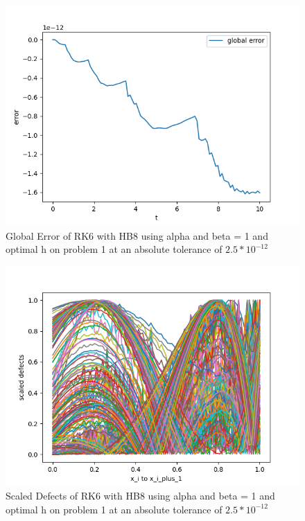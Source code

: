 \documentclass{article}
\begin{document}
\begin{figure}[H]
\centering
\includegraphics[width=0.7\linewidth]{./figures/sharp_tolerance_rk6_with_hb8_p1_global_error}
\caption{Global Error of RK6 with HB8 using alpha and beta = 1 and optimal h on problem 1 at an absolute tolerance of $2.5*10^{-12}$}
\label{fig:sharp_tolerance_rk6_with_hb8_p1_global_error}
\end{figure}

\begin{figure}[H]
\centering
\includegraphics[width=0.7\linewidth]{./figures/sharp_tolerance_rk6_with_hb8_p1_scaled_defects}
\caption{Scaled Defects of RK6 with HB8 using alpha and beta = 1 and optimal h on problem 1 at an absolute tolerance of $2.5*10^{-12}$}
\label{fig:sharp_tolerance_rk6_with_hb8_p1_scaled_defects}
\end{figure}
\end{document}
